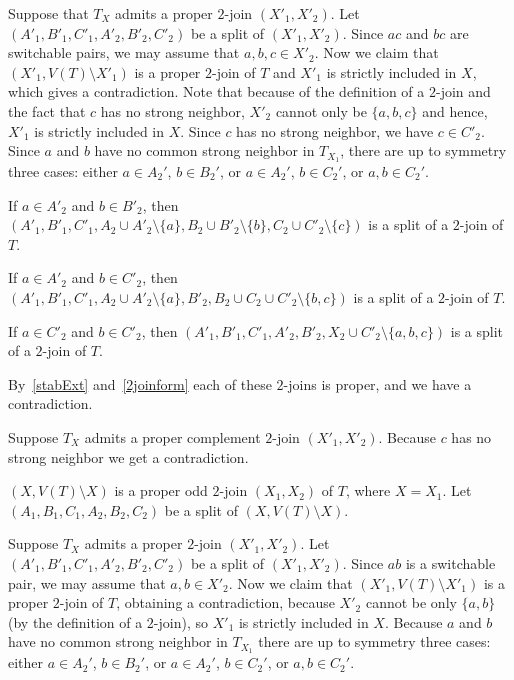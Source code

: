 \documentclass[11 pt] {article}
\newcounter{claim}
\begin{document}
Suppose that $T_X$ admits a proper $2$-join $(X'_1,X'_2)$. Let
$(A'_1,B'_1,C'_1,A'_2,B'_2,C'_2)$ be a split of $(X'_1,X'_2)$. Since
$ac$ and $bc$ are switchable pairs, we may assume that $a,b,c \in
X'_2$. Now we claim that $(X'_1, V(T)\setminus X'_1)$ is a proper
$2$-join of $T$ and $X'_1$ is strictly included in $X$, which gives a
contradiction. Note that because of the definition of a $2$-join and
the fact that $c$ has no strong neighbor, $X'_2$ cannot only be $\{a,
b, c\}$ and hence, $X'_1$ is strictly included in $X$.  Since $c$ has
no strong neighbor, we have $c\in C'_2$. Since $a$ and $b$ have no
common strong neighbor in $T_{X_1}$, there are up to symmetry three
cases: either $a\in A_2'$, $b\in B_2'$, or $a\in A_2'$, $b\in C_2'$,
or $a,b\in C_2'$.

If $a\in A'_2$ and $b\in B'_2$, then $(A'_1, B'_1, C'_1, A_2 \cup
A'_2\setminus \{a\}, B_2 \cup B'_2\setminus \{b\}, C_2 \cup
C'_2\setminus\{c\})$ is a split of a  $2$-join of $T$.

If $a\in A'_2$ and $b\in C'_2$, then $(A'_1,B'_1,C'_1, A_2 \cup
A'_2\setminus \{a\}, B'_2, B_2\cup C_2 \cup C'_2\setminus\{b,c\})$ is
a split of a $2$-join of $T$.

If $a\in C'_2$ and $b\in C'_2$, then $(A'_1, B'_1, C'_1, A'_2, B'_2,
X_2 \cup C'_2\setminus\{a,b,c\})$ is a split of a  $2$-join of
$T$.

By~\ref{stabExt} and~\ref{2joinform} each of these $2$-joins is proper, and we have a
contradiction.

Suppose $T_X$ admits a proper complement $2$-join $(X'_1,X'_2)$. Because
$c$ has no strong neighbor we get a contradiction.



 $(X,V(T)\setminus X)$ is a proper odd $2$-join
$(X_1, X_2)$ of $T$, where $X=X_1$. Let $(A_1,B_1,C_1,A_2,B_2,C_2)$ be a split of
$(X,V(T)\setminus X)$.

Suppose $T_X$ admits a proper $2$-join $(X'_1,X'_2)$. Let
$(A'_1,B'_1,C'_1,A'_2,B'_2,C'_2)$ be a split of $(X'_1,X'_2)$. Since
$ab$ is a switchable pair, we may assume that $a,b\in X'_2$. Now we
claim that $(X'_1, V(T)\setminus X'_1)$ is a proper $2$-join of $T$,
obtaining a contradiction, because $X'_2$ cannot be only $\{a,b\}$ (by
the definition of a $2$-join), so $X'_1$ is strictly included in $X$.
Because $a$ and $b$ have no common strong neighbor in $T_{X_1}$ there
are up to symmetry three cases: either $a\in A_2'$, $b\in B_2'$, or
$a\in A_2'$, $b\in C_2'$, or $a,b\in C_2'$.
\end{document}
